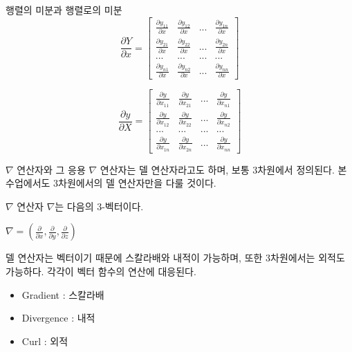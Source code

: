 \documentclass{beamer}
\begin{document}
\begin{frame}{행렬의 미분과 행렬로의 미분} 
\begin{equation} 
\frac{\partial Y}{\partial x} = \left[ \begin{matrix} 
\frac{\partial y_{11}}{\partial x} & \frac{\partial y_{12}}{\partial x} & ... & \frac{\partial y_{1n}}{\partial x} \\ 
\frac{\partial y_{21}}{\partial x} & \frac{\partial y_{22}}{\partial x} & ... & \frac{\partial y_{2n}}{\partial x} \\ 
... & ... & ... & ... \\
\frac{\partial y_{n1}}{\partial x} & \frac{\partial y_{n2}}{\partial x} & ... & \frac{\partial y_{nn}}{\partial x} \end{matrix} \right]
\end{equation}

\begin{equation} 
\frac{\partial y}{\partial X} = \left[ \begin{matrix} 
\frac{\partial y}{\partial x_{11}} & \frac{\partial y}{\partial x_{21}} & ... & \frac{\partial y}{\partial x_{n1}} \\ 
\frac{\partial y}{\partial x_{12}} & \frac{\partial y}{\partial x_{22}} & ... & \frac{\partial y}{\partial x_{n2}} \\ 
... & ... & ... & ... \\
\frac{\partial y}{\partial x_{1n}} & \frac{\partial y}{\partial x_{2n}} & ... & \frac{\partial y}{\partial x_{nn}} \end{matrix} \right]
\end{equation}
\end{frame}




\begin{frame}[allowframebreaks]{$\nabla$ 연산자와 그 응용}
$\nabla$ 연산자는 델 연산자라고도 하며, 보통 3차원에서 정의된다. 본 수업에서도 3차원에서의 델 연산자만을 다룰 것이다. 
\begin{block}{$\nabla$ 연산자} 
$\nabla$는 다음의 3-벡터이다.

$\nabla = (\frac{\partial}{\partial x}, \frac{\partial}{\partial y}, \frac{\partial}{\partial z})$
\end{block}

델 연산자는 벡터이기 때문에 스칼라배와 내적이 가능하며, 또한 3차원에서는 외적도 가능하다. 각각이 벡터 함수의 연산에 대응된다. 
\begin{itemize} 
\item Gradient : 스칼라배 
\item Divergence : 내적 
\item Curl : 외적 
\end{itemize}
\end{frame} 
\end{document}
